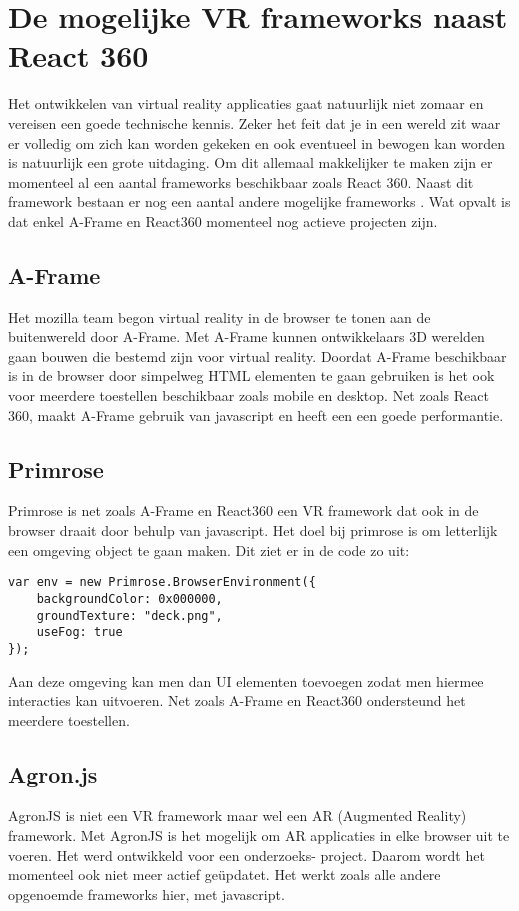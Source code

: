 \section{De mogelijke VR frameworks naast React 360}
\label{sec:frameworks-alternatieven}
Het ontwikkelen van virtual reality applicaties gaat natuurlijk niet zomaar en vereisen een goede technische kennis. Zeker het feit dat je in een wereld zit waar er volledig om zich kan worden gekeken en ook eventueel in bewogen kan worden is natuurlijk een grote uitdaging. Om dit allemaal makkelijker te maken zijn er momenteel al een aantal frameworks beschikbaar zoals React 360. Naast dit framework bestaan er nog een aantal andere mogelijke frameworks \autocite{UIUXLab2017}. Wat opvalt is dat enkel A-Frame en React360 momenteel nog actieve projecten zijn. 

\subsection{A-Frame}
\label{subsec:a-frame}
Het mozilla team begon virtual reality in de browser te tonen aan de buitenwereld door A-Frame. Met A-Frame kunnen ontwikkelaars 3D werelden gaan bouwen die bestemd zijn voor virtual reality. Doordat A-Frame beschikbaar is in de browser door simpelweg HTML elementen te gaan gebruiken is het ook voor meerdere toestellen beschikbaar zoals mobile en desktop. Net zoals React 360, maakt A-Frame gebruik van javascript en heeft een een goede performantie.
 
\subsection{Primrose}
\label{subsec:primrose}
Primrose is net zoals A-Frame en React360 een VR framework dat ook in de browser draait door behulp van javascript. Het doel bij primrose is om letterlijk een omgeving object te gaan maken. Dit ziet er in de code zo uit:

\begin{lstlisting}[frame=single, caption=Voorbeeld van primrose omgeving]
var env = new Primrose.BrowserEnvironment({
	backgroundColor: 0x000000,
	groundTexture: "deck.png",
	useFog: true
});
\end{lstlisting}

Aan deze omgeving kan men dan UI elementen toevoegen zodat men hiermee interacties kan uitvoeren. Net zoals A-Frame en React360 ondersteund het meerdere toestellen.

\subsection{Agron.js}
\label{subsec:agron.js}
AgronJS is niet een VR framework maar wel een AR (Augmented Reality) framework. Met AgronJS is het mogelijk om AR applicaties in elke browser uit te voeren. Het werd ontwikkeld voor een onderzoeks- project. Daarom wordt het momenteel ook niet meer actief geüpdatet. Het werkt zoals alle andere opgenoemde frameworks hier, met javascript.



